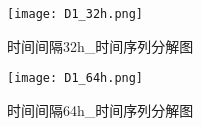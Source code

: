 \documentclass[withoutpreface,bwprint]{cumcmthesis}  %
\begin{document}
\begin{appendices}
        \begin{figure}[h!] 
            \begin{minipage}{.45\textwidth} %
                \centering  
                \texttt{[image: D1\_32h.png]}  
                \caption{时间间隔32h\_时间序列分解图}  
            \end{minipage}  
            \hfill %
            \begin{minipage}{.45\textwidth} %
                \centering  
                \texttt{[image: D1\_64h.png]}  
                \caption{时间间隔64h\_时间序列分解图}  
            \end{minipage}  
        \end{figure}

  

\end{appendices}
\end{document}
